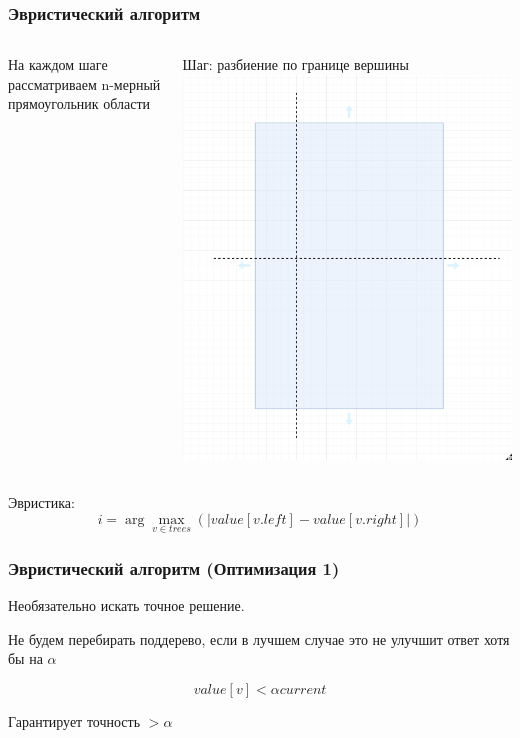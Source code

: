 \documentclass{beamer}
\begin{document}
\begin{frame} \frametitle{Эвристический алгоритм}

    \begin{columns}
            На каждом шаге рассматриваем n-мерный прямоугольник области

            Шаг: разбиение по границе вершины
            \includegraphics[width=\textwidth]{split.png}
    \end{columns}
    \vfill
    \pause{}
    Эвристика:
    \[
        i = \arg \max_{v \in trees}(|value[v.left] - value[v.right]|)
    \]
\end{frame}

\begin{frame} \frametitle{Эвристический алгоритм (Оптимизация 1)}
    Необязательно искать точное решение.

    \vspace{50px}
    Не будем перебирать поддерево, если в лучшем случае это не улучшит ответ хотя бы на $\alpha$

    \[
        value[v] < \alpha current
    \]

    Гарантирует точность $>\alpha$
\end{frame}
\end{document}
